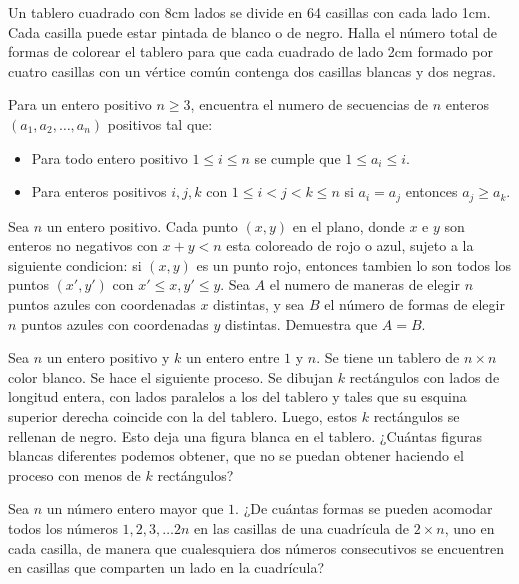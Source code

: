 \documentclass[11pt]{scrartcl}
\newcommand{\thmdifficulty}{0}
\newcommand{\problemdiff}[1]{\renewcommand{\thmdifficulty}{#1}}
\begin{document}
\problemdiff{3}
\begin{problem}
    Un tablero cuadrado con 8cm lados se divide en 64 casillas con cada lado 1cm. Cada casilla puede estar
pintada de blanco o de negro. Halla el número total de formas de colorear el tablero para que cada cuadrado
de lado 2cm formado por cuatro casillas con un vértice común contenga dos casillas blancas y dos negras.
\end{problem}

\problemdiff{3.5}
\begin{problem}
    Para un entero positivo $n \geq 3$, encuentra el numero de secuencias de $n$ enteros $(a_1, a_2, \ldots, a_n )$ positivos tal que:
    \begin{itemize}
        \item Para todo entero positivo $1 \leq i \leq n$ se cumple que $1\leq a_i \leq  i$.
        \item Para enteros positivos $i,j,k$ con $1 \leq i <j <k \leq n$ si $a_i=a_j$ entonces $a_j \geq a_k$.
    \end{itemize}
\end{problem}


\problemdiff{4}
\begin{problem}
    Sea $n$ un entero positivo. Cada punto $(x,y)$ en el plano, donde $x$ e $y$ son enteros no negativos con $x+y < n$ esta coloreado de rojo o azul,
    sujeto a la siguiente condicion: si $(x,y)$ es un punto rojo, entonces tambien lo son todos los puntos $(x',y')$ con $x'\leq x, y'\leq y$. Sea $A$ el numero 
    de maneras de elegir $n$ puntos azules con coordenadas $x$ distintas, y sea $B$ el número de formas de elegir $n$ puntos azules con coordenadas $y$ distintas. Demuestra que $A=B$.
\end{problem}

\problemdiff{4}
\begin{problem}
      Sea $n$ un entero positivo y $k$ un entero entre $1$ y $n$. Se tiene un tablero de $n \times n$ color blanco. Se hace el siguiente proceso. Se dibujan $k$ rectángulos con lados de longitud entera, con lados paralelos a los del tablero y tales que su esquina superior derecha coincide con la del tablero. Luego, estos $k$ rectángulos se rellenan de negro. Esto deja una figura blanca en el tablero.
¿Cuántas figuras blancas diferentes podemos obtener, que no se puedan obtener haciendo el proceso con menos de $k$ rectángulos?
\end{problem}

\problemdiff{4}
\begin{problem}
    Sea $n$ un número entero mayor que $1$. ¿De cuántas formas se pueden acomodar todos los números $1,2,3,\dots 2n$ en las casillas de una cuadrícula de $2\times n$, uno en cada casilla, de manera que cualesquiera dos números consecutivos se encuentren en casillas que comparten un lado en la cuadrícula?
\end{problem}
\end{document}
